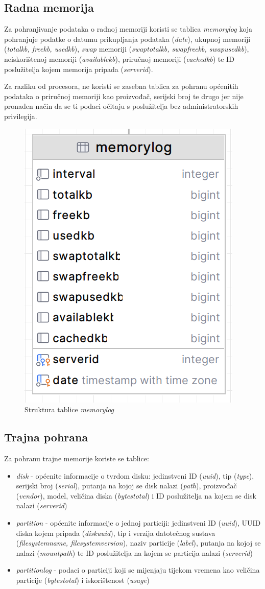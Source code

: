 \documentclass[zavrsnirad]{fer}
\begin{document}
\subsection{Radna memorija}
Za pohranjivanje podataka o radnoj memoriji koristi se tablica \textit{memorylog} koja pohranjuje podatke o datumu prikupljanja podataka (\textit{date}), ukupnoj memoriji (\textit{totalkb, freekb, usedkb}), \textit{swap} memoriji (\textit{swaptotalkb, swapfreekb, swapusedkb}), neiskorištenoj memoriji (\textit{availablekb}), priručnoj memoriji (\textit{cachedkb}) te ID poslužitelja kojem memorija pripada (\textit{serverid}).

Za razliku od procesora, ne koristi se zasebna tablica za pohranu općenitih podataka o priručnoj memoriji kao proizvođač, serijski broj te drugo jer nije pronađen način da se ti podaci očitaju s poslužitelja bez administratorskih privilegija.

\begin{figure}[htb!]
	\centering
	\includegraphics[width=0.3\linewidth]{images/db_memorylog.png} 
	\caption{Struktura tablice \textit{memorylog}}
\end{figure}
\FloatBarrier

\subsection{Trajna pohrana}
Za pohranu trajne memorije koriste se tablice:
\begin{itemize}
	\item \textit{disk} - općenite informacije o tvrdom disku: jedinstveni ID (\textit{uuid}), tip (\textit{type}), serijski broj (\textit{serial}), putanja na kojoj se disk nalazi (\textit{path}), proizvođač (\textit{vendor}), model, veličina diska (\textit{bytestotal}) i ID poslužitelja na kojem se disk nalazi (\textit{serverid})
	\item \textit{partition} - općenite informacije o jednoj particiji: jedinstveni ID (\textit{uuid}), UUID diska kojem pripada (\textit{diskuuid}), tip i verzija datotečnog sustava (\textit{filesystemname, filesystemversion}), naziv particije (\textit{label}), putanja na kojoj se nalazi (\textit{mountpath}) te ID poslužitelja na kojem se particija nalazi (\textit{serverid})
	\item \textit{partitionlog} - podaci o particiji koji se mijenjaju tijekom vremena kao veličina particije (\textit{bytestotal}) i iskorištenost (\textit{usage})
\end{itemize}
\end{document}
